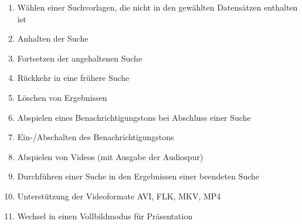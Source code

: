 \begin{enumerate} [label=\bfseries /F \arabic*0/]
	\subsection{Wunsch}
	\item Wählen einer Suchvorlagen, die nicht in den gewählten Datensätzen enthalten ist

	\item Anhalten der Suche 	%
	\item Fortsetzen der angehaltenen Suche 	%
	\item Rückkehr in eine frühere Suche %

	\item Löschen von Ergebnissen %
	\item Abspielen eines Benachrichtigungstons bei Abschluss einer Suche
	\item Ein-/Abschalten des Benachrichtigungstons
	\item Abspielen von Videos (mit Ausgabe der Audiospur)
	\item Durchführen einer Suche in den Ergebnissen einer beendeten Suche

	\item Unterstützung der Videoformate AVI, FLK, MKV, MP4
	\item Wechsel in einen Vollbildmodus für Präsentation

\end{enumerate}
